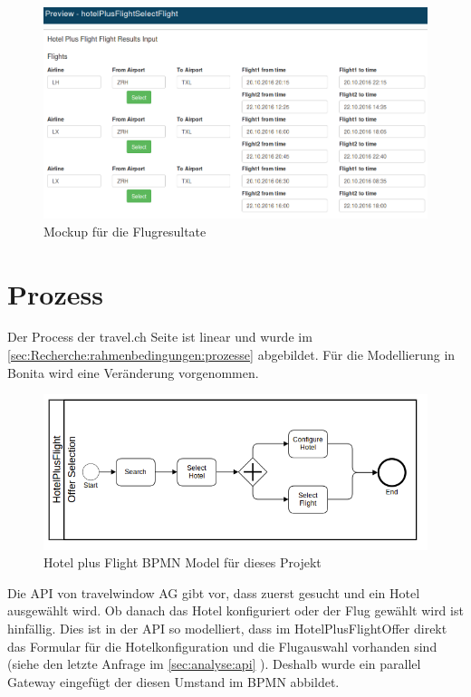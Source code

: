 \begin{figure}[H]
	\centering
	\includegraphics[width=1\textwidth]{images/forms-select-flight.png}
	\caption{Mockup für die Flugresultate}
	\label{fig:konzept:mockups:selectflight}
\end{figure}


\section{Prozess}
\label{sec:konzept:prozess}
Der Process der travel.ch Seite ist linear und wurde im \cref{sec:Recherche:rahmenbedingungen:prozesse}  abgebildet. Für die Modellierung in Bonita wird eine Veränderung vorgenommen.
\begin{figure}[H]
	\centering
	\includegraphics[width=1\textwidth]{images/hotelplusflightbonita.png}
	\caption{Hotel plus Flight BPMN Model für dieses Projekt}
	\label{fig:konzept:mockups:selectflight}
\end{figure}
Die API von travelwindow AG gibt vor, dass zuerst gesucht und ein Hotel ausgewählt wird. Ob danach das Hotel konfiguriert oder der Flug gewählt wird ist hinfällig. Dies ist in der API so modelliert, dass im HotelPlusFlightOffer direkt das Formular für die Hotelkonfiguration und die Flugauswahl vorhanden sind (siehe den letzte Anfrage im \cref{sec:analyse:api} ). Deshalb wurde ein parallel Gateway eingefügt der diesen Umstand im BPMN abbildet.